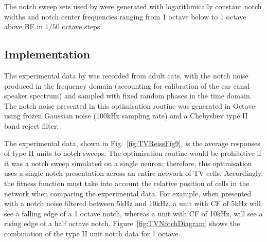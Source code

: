 

The notch sweep sets used by \citeauthor{ReissYoung:2005} were generated
with logarithmically constant notch widths and notch center frequencies
ranging from 1 octave below to 1 octave above BF in $1/50$ octave steps.

\subsection{Implementation}

The experimental data by \citet{ReissYoung:2005} was recorded from adult
cats, with the notch noise produced in the frequency domain (accounting for
calibration of the ear canal speaker spectrum) and sampled with fixed
random phases in the time domain. The notch noise presented in this
optimisation routine was generated in Octave using frozen Gaussian noise
(100kHz sampling rate) and a Chebyshev type II band reject filter.

\smallskip{}

The experimental data, shown in Fig.~\ref{fig:TVReissFig9}, is the average
responses of type II units to notch sweeps. The optimisation routine would be
prohibitive if it was a notch sweep simulated on a single neuron; therefore,
this optimisation uses a single notch presentation across an entire network of
TV cells. Accordingly, the fitness function must take into account the relative
position of cells in the network when comparing the experimental data.  For
example, when presented with a notch noise filtered between 5kHz and 10kHz, a
unit with CF of 5kHz will see a falling edge of a 1 octave notch, whereas a unit
with CF of 10kHz, will see a rising edge of a half octave notch.
Figure~\ref{fig:TVNotchDiagram} shows the combination of the type II unit notch
data for 1 octave.

